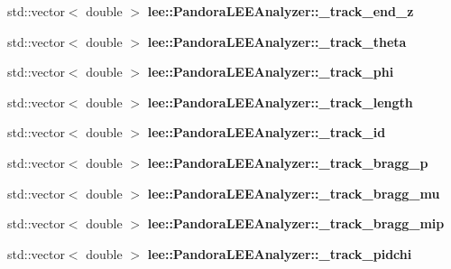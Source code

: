 \begin{DoxyCompactItemize}
\item 
\hypertarget{group__lee_ga147c8d113ee9fc316a7addd39e392d71}{std\-::vector$<$ double $>$ {\bfseries lee\-::\-Pandora\-L\-E\-E\-Analyzer\-::\-\_\-track\-\_\-end\-\_\-z}}\label{group__lee_ga147c8d113ee9fc316a7addd39e392d71}

\item 
\hypertarget{group__lee_ga320eaa4a60f4628c6320c5c721f2899c}{std\-::vector$<$ double $>$ {\bfseries lee\-::\-Pandora\-L\-E\-E\-Analyzer\-::\-\_\-track\-\_\-theta}}\label{group__lee_ga320eaa4a60f4628c6320c5c721f2899c}

\item 
\hypertarget{group__lee_gae045ae6a478b38e3d165ced855b610e4}{std\-::vector$<$ double $>$ {\bfseries lee\-::\-Pandora\-L\-E\-E\-Analyzer\-::\-\_\-track\-\_\-phi}}\label{group__lee_gae045ae6a478b38e3d165ced855b610e4}

\item 
\hypertarget{group__lee_ga801ed095fb9dfb752f424ea91107cffc}{std\-::vector$<$ double $>$ {\bfseries lee\-::\-Pandora\-L\-E\-E\-Analyzer\-::\-\_\-track\-\_\-length}}\label{group__lee_ga801ed095fb9dfb752f424ea91107cffc}

\item 
\hypertarget{group__lee_ga13a633d3b83e96b70adae044df973ec7}{std\-::vector$<$ double $>$ {\bfseries lee\-::\-Pandora\-L\-E\-E\-Analyzer\-::\-\_\-track\-\_\-id}}\label{group__lee_ga13a633d3b83e96b70adae044df973ec7}

\item 
\hypertarget{group__lee_ga4297d696c8a18a62866df4ae2af0115f}{std\-::vector$<$ double $>$ {\bfseries lee\-::\-Pandora\-L\-E\-E\-Analyzer\-::\-\_\-track\-\_\-bragg\-\_\-p}}\label{group__lee_ga4297d696c8a18a62866df4ae2af0115f}

\item 
\hypertarget{group__lee_ga26c2928e27efaef45a0bd73265732f61}{std\-::vector$<$ double $>$ {\bfseries lee\-::\-Pandora\-L\-E\-E\-Analyzer\-::\-\_\-track\-\_\-bragg\-\_\-mu}}\label{group__lee_ga26c2928e27efaef45a0bd73265732f61}

\item 
\hypertarget{group__lee_ga54899eb2a96c6b30e3aa350877ee396f}{std\-::vector$<$ double $>$ {\bfseries lee\-::\-Pandora\-L\-E\-E\-Analyzer\-::\-\_\-track\-\_\-bragg\-\_\-mip}}\label{group__lee_ga54899eb2a96c6b30e3aa350877ee396f}

\item 
\hypertarget{group__lee_gad41a5c8f9908d57ca71dafdd1acffa77}{std\-::vector$<$ double $>$ {\bfseries lee\-::\-Pandora\-L\-E\-E\-Analyzer\-::\-\_\-track\-\_\-pidchi}}\label{group__lee_gad41a5c8f9908d57ca71dafdd1acffa77}


\end{DoxyCompactItemize}

